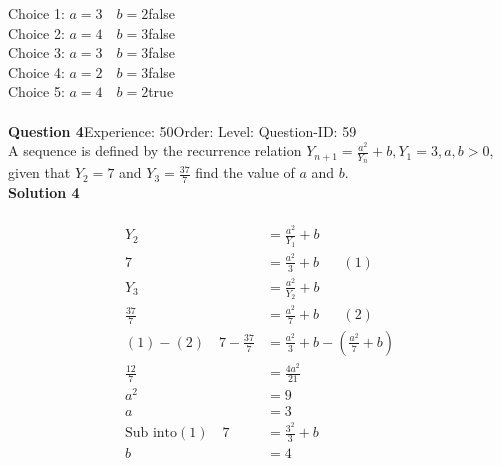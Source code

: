 \documentclass{article}
\begin{document}
Choice 1: \hspace{20pt}$a=3\quad b=2$\hspace{20pt}false\\
Choice 2: \hspace{20pt}$a=4\quad b=3$\hspace{20pt}false\\
Choice 3: \hspace{20pt}$a=3\quad b=3$\hspace{20pt}false\\
Choice 4: \hspace{20pt}$a=2\quad b=3$\hspace{20pt}false\\
Choice 5: \hspace{20pt}$a=4\quad b=2$\hspace{20pt}true\\
\\[4pt]
\noindent\textbf{Question 4}\hspace{20pt}Experience: 50\hspace{20pt}Order: \hspace{20pt}Level: \hspace{20pt}Question-ID: 59\\[2pt]
A sequence is defined by the recurrence relation $Y_{n+1}=\displaystyle\frac{a^2}{Y_n}+b, Y_1=3, a,b>0$, given that $Y_2=7$ and $Y_3=\displaystyle\frac{37}{7}$ find the value of $a$ and $b$.\\[4pt]
\noindent\textbf{Solution 4}\\[2pt]
\\[-35pt]\begin{align*}
Y_2&=\displaystyle\frac{a^2}{Y_1}+b\\[2pt]
7&=\displaystyle\frac{a^2}{3}+b\hspace{20pt}(1)\\[12pt]
Y_3&=\displaystyle\frac{a^2}{Y_2}+b\\[2pt]
\displaystyle\frac{37}{7}&=\displaystyle\frac{a^2}{7}+b\hspace{20pt}(2)\\[2pt]
(1)-(2)\quad 7-\displaystyle\frac{37}{7}&=\frac{a^2}{3}+b-\left(\frac{a^2}{7}+b\right)\\[2pt]
\displaystyle\frac{12}{7}&=\displaystyle\frac{4a^2}{21}\\[2pt]
a^2&=9\\[2pt]
a&=3\\[12pt]
\text{Sub into} (1)\quad 7&=\displaystyle\frac{3^2}{3}+b\\[2pt]
b&=4
\end{align*}
\end{document}
